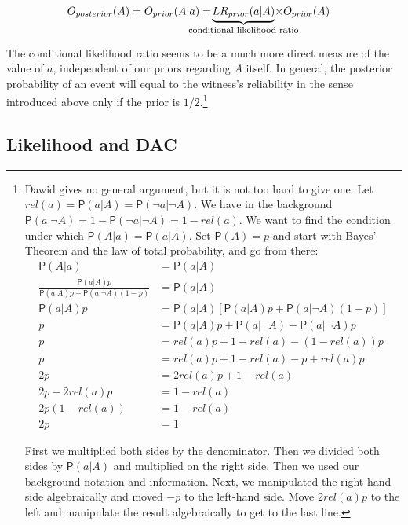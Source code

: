 \documentclass[10pt,dvipsnames,enabledeprecatedfontcommands]{scrartcl}
\newcommand{\n}{\neg}
\newcommand{\pr}[1]{\mathsf{P}(#1)}
\begin{document}
\begin{align}
 \label{bayesodss2}
 O_{posterior}(A)& = O_{prior}(A\vert a) = \!\!\!\!\!  \!\!\!\!\!  \!\! \!\!  \underbrace{LR_{prior}(a\vert A)}_{\mbox{\footnotesize conditional likelihood ratio}}  \!\!\!\!\!   \!\!\!\!\!  \!\! \!\!   \times  O_{prior}(A)
 \end{align}

The conditional likelihood ratio seems to be a much more direct measure
of the value of \(a\), independent of our priors regarding \(A\) itself.
In general, the posterior probability of an event will equal to the
witness's reliability in the sense introduced above only if the prior is
\(1/2\).\footnote{Dawid gives no general argument, but it is not too hard to  give one. Let $rel(a)=\pr{a\vert A}=\pr{\n a\vert \n A}$. We have in the background $\pr{a\vert \n A}=1-\pr{\n a\vert \n A}=1-rel(a)$.
 We want to find the condition under which $\pr{A\vert a} = \pr{a\vert A}$. Set $\pr{A}=p$ and  start with Bayes' Theorem and the law of total probability, and go from there:
 \begin{align*}
 \pr{A\vert a}& = \pr{a\vert A}\\
 \frac{\pr{a\vert A}p}{\pr{a\vert A}p+\pr{a\vert \n A}(1-p)} &= \pr{a\vert A} \\
 \pr{a\vert A}p & = \pr{a\vert A}[\pr{a\vert A}p+\pr{a\vert \n A}(1-p)]\\
 p & = \pr{a\vert A}p + \pr{a\vert \n A} - \pr{a\vert \n A}p\\
 p &= rel(a) p + 1-rel(a)- (1-rel(a))p\\
 p & = rel(a)p +1 - rel(a) -p +rel(a)p \\
 2p & =  2rel(a)p + 1 - rel(a)  \\
 2p - 2 rel(a)p & = 1-rel(a)\\
 2p(1-rel(a)) &= 1-rel(a)\\
 2p & = 1
 \end{align*}

\noindent  First we multiplied both sides by the denominator. Then we divided both sides by $\pr{a\vert A}$ and multiplied on the right side. Then we used our background notation and information. Next, we manipulated the right-hand side algebraically and  moved  $-p$ to the left-hand side. Move $2rel(a)p$ to the left and manipulate the result algebraically to get to the last line.}

\subsection{Likelihood and DAC}\label{likelihood-and-dac}
\end{document}
